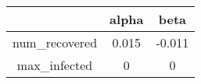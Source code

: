 \begin{tabular}{|c|c|c|}
\hline
& alpha & beta \\
\hline
num_recovered & 0.015 & -0.011 \\
\hline
max_infected & 0 & 0 \\
\hline
\end{tabular}

